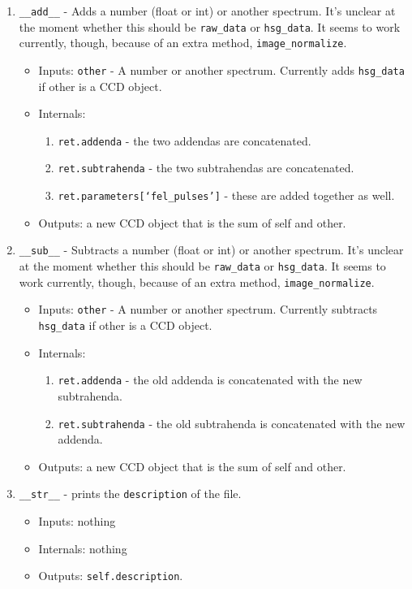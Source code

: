 \documentclass{article}
\newcommand{\code}{\texttt}
\begin{document}
\begin{enumerate}
	\item \code{\_\_add\_\_} - Adds a number (float or int) or another spectrum.  It's unclear at the moment whether this should be \code{raw\_data} or \code{hsg\_data}.  It seems to work currently, though, because of an extra method, \code{image\_normalize}.
	\begin{itemize}
		\item Inputs: \code{other} - A number or another spectrum.  Currently adds \code{hsg\_data} if other is a CCD object.
		\item Internals:
		\begin{enumerate}
			\item \code{ret.addenda} - the two addendas are concatenated.
			\item \code{ret.subtrahenda} - the two subtrahendas are concatenated.
			\item \code{ret.parameters[`fel\_pulses']} - these are added together as well.
		\end{enumerate}
		\item Outputs: a new CCD object that is the sum of self and other.
	\end{itemize}
	
	\item \code{\_\_sub\_\_} - Subtracts a number (float or int) or another spectrum.  It's unclear at the moment whether this should be \code{raw\_data} or \code{hsg\_data}.  It seems to work currently, though, because of an extra method, \code{image\_normalize}.
	\begin{itemize}
		\item Inputs: \code{other} - A number or another spectrum.  Currently subtracts \code{hsg\_data} if other is a CCD object.
		\item Internals:
		\begin{enumerate}
			\item \code{ret.addenda} - the old addenda is concatenated with the new subtrahenda.
			\item \code{ret.subtrahenda} - the old subtrahenda is concatenated with the new addenda.
		\end{enumerate}
		\item Outputs: a new CCD object that is the sum of self and other.
	\end{itemize}
	
	\item \code{\_\_str\_\_} - prints the \code{description} of the file.
		\begin{itemize}
		\item Inputs: nothing
		\item Internals: nothing
		\item Outputs: \code{self.description}.
	\end{itemize}
\end{enumerate}
\end{document}
